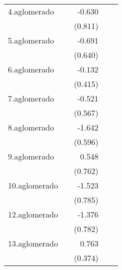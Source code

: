 {\begin{longtable}{l*{4}{D{.}{.}{-1}}}
\addlinespace
4.aglomerado&                     &      -0.630         &                     &                     \\
            &                     &     (0.811)         &                     &                     \\
\addlinespace
5.aglomerado&                     &      -0.691         &                     &                     \\
            &                     &     (0.640)         &                     &                     \\
\addlinespace
6.aglomerado&                     &      -0.132         &                     &                     \\
            &                     &     (0.415)         &                     &                     \\
\addlinespace
7.aglomerado&                     &      -0.521         &                     &                     \\
            &                     &     (0.567)         &                     &                     \\
\addlinespace
8.aglomerado&                     &      -1.642\sym{**} &                     &                     \\
            &                     &     (0.596)         &                     &                     \\
\addlinespace
9.aglomerado&                     &       0.548         &                     &                     \\
            &                     &     (0.762)         &                     &                     \\
\addlinespace
10.aglomerado&                     &      -1.523         &                     &                     \\
            &                     &     (0.785)         &                     &                     \\
\addlinespace
12.aglomerado&                     &      -1.376         &                     &                     \\
            &                     &     (0.782)         &                     &                     \\
\addlinespace
13.aglomerado&                     &       0.763\sym{*}  &                     &                     \\
            &                     &     (0.374)         &                     &                     \\

\end{longtable}}

